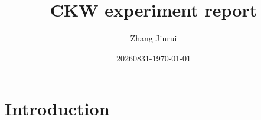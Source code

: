\documentclass{book}
\title{CKW experiment report}
\author{Zhang Jinrui}
\date{20260831-\today}
\begin{document}
\maketitle          %
\tableofcontents    %

\chapter{Introduction}


% 
\end{document}

